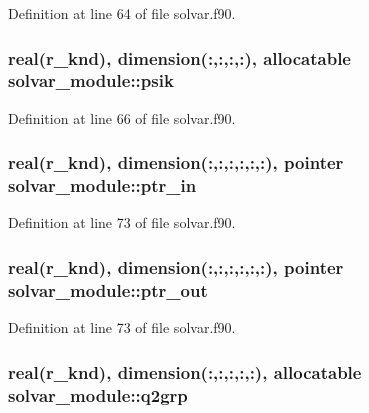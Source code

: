 Definition at line 64 of file solvar.\-f90.

\hypertarget{classsolvar__module_a9d00ffefc30874b3b293efb307b3e551}{
\subsubsection[{psik}]{\setlength{\rightskip}{0pt plus 5cm}real(r\-\_\-knd), dimension(\-:,\-:,\-:,\-:), allocatable solvar\-\_\-module\-::psik}}\label{classsolvar__module_a9d00ffefc30874b3b293efb307b3e551}


Definition at line 66 of file solvar.\-f90.

\hypertarget{classsolvar__module_ac95d5a5e2f90e8f827801c3616afd3cc}{
\subsubsection[{ptr\-\_\-in}]{\setlength{\rightskip}{0pt plus 5cm}real(r\-\_\-knd), dimension(\-:,\-:,\-:,\-:,\-:,\-:), pointer solvar\-\_\-module\-::ptr\-\_\-in}}\label{classsolvar__module_ac95d5a5e2f90e8f827801c3616afd3cc}


Definition at line 73 of file solvar.\-f90.

\hypertarget{classsolvar__module_aaa582c1084c73e20d39d834455a825d1}{
\subsubsection[{ptr\-\_\-out}]{\setlength{\rightskip}{0pt plus 5cm}real(r\-\_\-knd), dimension(\-:,\-:,\-:,\-:,\-:,\-:), pointer solvar\-\_\-module\-::ptr\-\_\-out}}\label{classsolvar__module_aaa582c1084c73e20d39d834455a825d1}


Definition at line 73 of file solvar.\-f90.

\hypertarget{classsolvar__module_a251ab88a6dab1f3da07d22096331b932}{
\subsubsection[{q2grp}]{\setlength{\rightskip}{0pt plus 5cm}real(r\-\_\-knd), dimension(\-:,\-:,\-:,\-:,\-:), allocatable solvar\-\_\-module\-::q2grp}}\label{classsolvar__module_a251ab88a6dab1f3da07d22096331b932}


